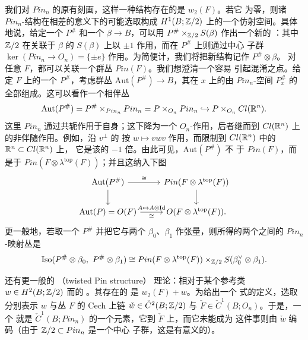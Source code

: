 我们对 $Pin_n$ 的原有刻画，这样一种结构存在的\trObstruction{}是 $w_2(F)$。若它
为零，则诸 $Pin_n$-结构在相差\trIsomorphism{}的意义下的可能选取构成
$H^1(B;\mathbb{Z}/2)$ 上的一个仿射空间。具体地说，给定一个 \trPinStructure{}
$P^\#$ 和一个\trRealLineBundle{} $\beta\to B$，可以用\trFibreProduct{}
$P^\#\times_{\mathbb{Z}/2}S(\beta)$ 作出一个新的 \trPinStructure：其中 $\mathbb{Z}/2$ 在关联于
$\beta$ 的\trDoubleCover{} $S(\beta)$ 上以 $\pm1$ 作用，而在 $P^\#$ 上则通过中心
子群 $\ker(Pin_n\to O_n)=\{\pm e\}$ 作用。为简便计，我们将把新结构记作
$P^\#\otimes\beta$。
对任意\trVectorBundle{} $F$，都可以关联一个群丛 $Pin(F)$。我们想澄清一个容易
引起混淆之点。给定 $F$ 上的一个 \trPinStructure{} $P^\#$，考虑群丛
$\mathrm{Aut}(P^\#)\to B$，其在 $x$ 上的\trFiber{}由\trPrincipalHomogeneousSpace
{} $Pin_n$-空间 $P_x^\#$ 的全部\trAutomorphism{}组成。这可以看作一个相伴丛
\begin{equation*}
\mathrm{Aut}(P^\#)=P^\#\times_{Pin_n}Pin_n=P\times_{O_n}Pin_n
\hookrightarrow P\times_{O_n}Cl(\mathbb{R}^n).
\end{equation*}
这里 $Pin_n$ 通过共轭作用于自身；这下降为一个 $O_n$-作用，后者继而\trEmbedding{}到
$Cl(\mathbb{R}^n)$ 上的非\trTwisted{}伴随作用。例如，沿\trHyperplane{} $v^\perp$ 的\trReflection
{}按 $w\mapsto vwv$ 作用，而限制到 $Cl(\mathbb{R}^n)$ 中的 $\mathbb{R}^n\subset Cl(\mathbb{R}^n)$ 上，
它是该\trReflection{}的 $-1$ 倍。由此可见，$\mathrm{Aut}(P^\#)$ 不%
\trIsomorphic{}于 $Pin(F)$，而是\trIsomorphic{}于
$Pin(F\otimes\lambda^{\mathrm{top}}(F))$；并且这纳入下图
\begin{equation}\label{eq:aut-pin-diagram}
\begin{tikzcd}
\mathrm{Aut}(P^\#)\ar[r,"\cong"]\ar[d]
  & Pin(F\otimes\lambda^{\mathrm{top}}(F))\ar[d] \\
\mathrm{Aut}(P)=O(F)\ar[r,"A\mapsto A\otimes\mathrm{Id}","\cong"']
  & O(F\otimes\lambda^{\mathrm{top}}(F)).
\end{tikzcd}
\end{equation}
更一般地，若取一个 \trPinStructure{} $P^\#$ 并把它与两个\trLineBundle{}
$\beta_0$、$\beta_1$ 作张量，则所得的两个\trPrincipalBundle{}之间的
$Pin_n$-\trEquivariant{}映射丛是
\begin{equation}\label{eq:pin-equivariant-iso}
\mathrm{Iso}(P^\#\otimes\beta_0,\ P^\#\otimes\beta_1)\cong
Pin(F\otimes\lambda^{\mathrm{top}}(F))\times_{\mathbb{Z}/2}
S(\beta_0^\vee\otimes\beta_1).
\end{equation}
\begin{remark}\label{thm:twisted-pin-structures}
还有更一般的\textbf{\trTwisted{} \trPinStructure}（twisted Pin structure）
理论：相对于某个参考类 $w\in H^2(B;\mathbb{Z}/2)$ 而\trTwisted{}的 \trPinStructure。其存在的%
\trObstruction{}是 $w_2(F)+w$。为给出一个 \trGerbe{}式的定义，选取分别表示 $w$
与丛 $F$ 的 Cech 上链 $\check{w}\in\check{C}^2(B;\mathbb{Z}/2)$ 与
$\check{F}\in\check{C}^1(B;O_n)$。于是，一个\trTwisted{} \trPinStructure{}就是
$\check{C}^1(B;Pin_n)$ 的一个元素，它\trProjection{}到 $\check{F}$ 上，而它未能成为%
\trCocycle{}这件事则由 $\check{w}$ 编码（由于 $\mathbb{Z}/2\subset Pin_n$ 是一个中心
子群，这是有意义的）。
\end{remark}
